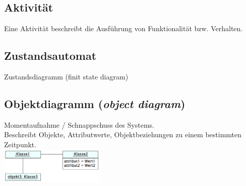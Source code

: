  \begin{multicols}{2}
	\subsection{Aktivität }
  		Eine Aktivität beschreibt die Ausführung von Funktionalität bzw. Verhalten.

	\subsection{Zustandsautomat }
 		 Zustandsdiagramm (finit state diagram)
 \end{multicols}
 
\subsection{Objektdiagramm (\textit{object diagram})}
	\begin{multicols}{2}
		Momentaufnahme / Schnappschuss des Systems. \\
		Beschreibt Objekte, Attributwerte, Objektbeziehungen zu einem bestimmten Zeitpunkt. \\
	\columnbreak
		\includegraphics[width=5cm]{./bilder/objektdiagramm}
	\end{multicols}



